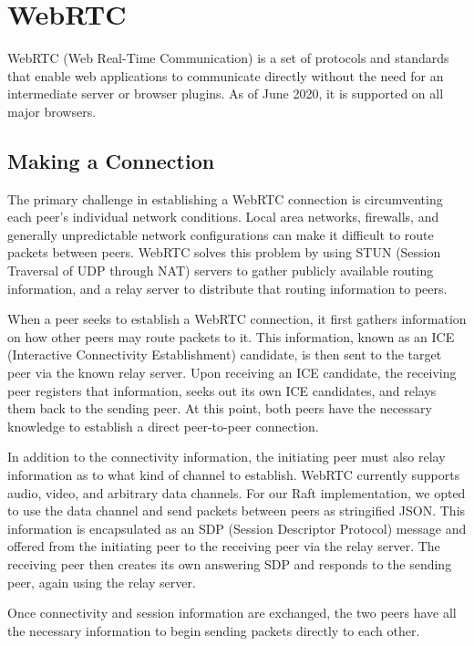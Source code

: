 \documentclass[11pt,twocolumn]{article}
\begin{document}
\section{WebRTC}

WebRTC \cite{webrtcwebsite} (Web Real-Time Communication) is a set of protocols and standards that enable web applications to communicate directly without the need for an intermediate server or browser plugins. As of June 2020, it is supported on all major browsers.

\subsection{Making a Connection}
The primary challenge in establishing a WebRTC connection is circumventing each peer's individual network conditions. Local area networks, firewalls, and generally unpredictable network configurations can make it difficult to route packets between peers. WebRTC solves this problem by using STUN (Session Traversal of UDP through NAT) servers to gather publicly available routing information, and a relay server to distribute that routing information to peers.

When a peer seeks to establish a WebRTC connection, it first gathers information on how other peers may route packets to it. This information, known as an ICE (Interactive Connectivity Establishment) candidate, is then sent to the target peer via the known relay server. Upon receiving an ICE candidate, the receiving peer registers that information, seeks out its own ICE candidates, and relays them back to the sending peer. At this point, both peers have the necessary knowledge to establish a direct peer-to-peer connection.

In addition to the connectivity information, the initiating peer must also relay information as to what kind of channel to establish. WebRTC currently supports audio, video, and arbitrary data channels. For our Raft implementation, we opted to use the data channel and send packets between peers as stringified JSON. This information is encapsulated as an SDP (Session Descriptor Protocol) message and offered from the initiating peer to the receiving peer via the relay server. The receiving peer then creates its own answering SDP and responds to the sending peer, again using the relay server.

Once connectivity and session information are exchanged, the two peers have all the necessary information to begin sending packets directly to each other.
\end{document}
